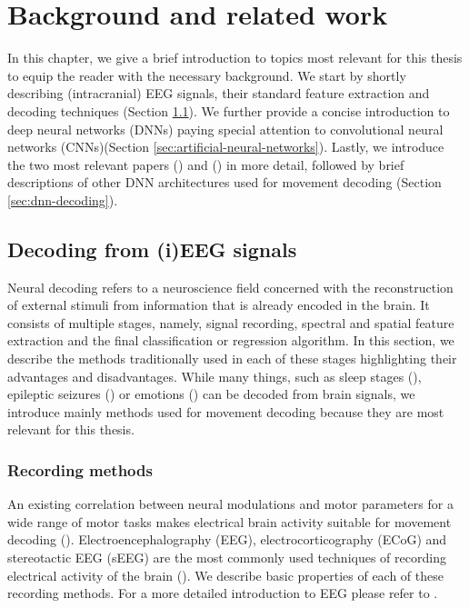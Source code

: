 \chapter{Background and related work}
\label{chap:background}
In this chapter, we give a brief introduction to topics most relevant for this thesis to equip the reader with the necessary background.
We start by shortly describing (intracranial) EEG signals, their standard feature extraction and decoding techniques (Section \ref{sec:decoding-from-ieeg}). We further provide a concise introduction to deep neural networks (DNNs) paying special attention to convolutional neural networks (CNNs)(Section \ref{sec:artificial-neural-networks}).
Lastly, we introduce the two most relevant papers (\cite{Hammer-2021}) and (\cite{schirrmeister-deep-2017}) in more detail, followed by brief descriptions of other DNN architectures used for movement decoding (Section \ref{sec:dnn-decoding}).

\section{Decoding from (i)EEG signals}
\label{sec:decoding-from-ieeg}
Neural decoding refers to a neuroscience field concerned with the reconstruction of external stimuli from information that is already encoded in the brain.
It consists of multiple stages, namely, signal recording, spectral and spatial feature extraction and the final classification or regression algorithm. 
In this section, we describe the methods traditionally used in each of these stages highlighting their advantages and disadvantages. 
While many things, such as sleep stages (\cite{sleep-eegnet}), epileptic seizures (\cite{epileptic-seizures-eeg}) or emotions (\cite{emotion-eeg}) can be decoded from brain signals, we introduce mainly methods used for movement decoding because they are most relevant for this thesis. 

\subsection{Recording methods}
An existing correlation between neural modulations and motor parameters for a wide range of motor tasks makes electrical brain activity suitable for movement decoding  (\cite{lebedev-cortical-2005}).
Electroencephalography (EEG), electrocorticography (ECoG) and stereotactic EEG (sEEG) are the most commonly used techniques of recording electrical activity of the brain (\cite{tam-human-2019}).
We describe basic properties of each of these recording methods. For a more detailed introduction to EEG please refer to \cite{NiedermeyersElectroencephalography}.

